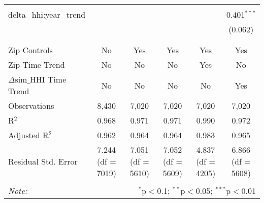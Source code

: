 \begin{table}[H]
{\begin{tabular}{@{\extracolsep{5pt}}lccccc}
   & & & & & \\  

  delta\_hhi:year\_trend &  &  &  &  & 0.401$^{***}$ \\  

   &  &  &  &  & (0.062) \\  

   & & & & & \\  

 \hline \\[-1.8ex]  

 Zip Controls & No & Yes & Yes & Yes & Yes \\  

 Zip Time Trend & No & No & No & Yes & No \\  

 $\Delta \text{sim\_HHI}$ Time Trend & No & No & No & No & Yes \\  

 Observations & 8,430 & 7,020 & 7,020 & 7,020 & 7,020 \\  

 R$^{2}$ & 0.968 & 0.971 & 0.971 & 0.990 & 0.972 \\  

 Adjusted R$^{2}$ & 0.962 & 0.964 & 0.964 & 0.983 & 0.965 \\  

 Residual Std. Error & 7.244 (df = 7019) & 7.051 (df = 5610) & 7.052 (df = 5609) & 4.837 (df = 4205) & 6.866 (df = 5608) \\  

 \hline  

 \hline \\[-1.8ex]  

 \textit{Note:}  & \multicolumn{5}{r}{$^{*}$p$<$0.1; $^{**}$p$<$0.05; $^{***}$p$<$0.01} \\  

 \end{tabular}}  

 \end{table}  

 



